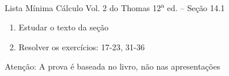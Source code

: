 \begin{frame}{Lista Mínima}
  Cálculo Vol. 2 do Thomas 12\textsuperscript{a} ed. -- Seção 14.1
  \begin{enumerate}
    \item Estudar o texto da seção
    \item Resolver os exercícios: 17-23, 31-36
  \end{enumerate}

  \vfill
  Atenção: A prova é baseada no livro, não nas apresentações
\end{frame}


